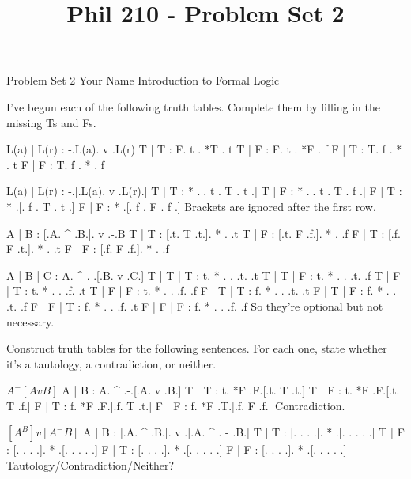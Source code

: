 
\title{Phil 210 - Problem Set 2}

\heading
Problem Set 2
Your Name
Introduction to Formal Logic
\endheading

I've begun each of the following truth tables. Complete them by filling in the missing Ts and Fs.

\problems
{}
\truthtable
 L(a) | L(r) : -.L(a).  v  .L(r)
\truthtableline
  T   |  T   : F. t  . *T  . t
  T   |  F   : F. t  . *F  . f
  F   |  T   : T. f  . *   . t
  F   |  F   : T. f  . *   . f
\endtruthtable

\truthtable
 L(a) | L(r) :  -.[.L(a). v .L(r).]
\truthtableline
  T   |  T   : * .[. t  . T . t  .]
  T   |  F   : * .[. t  . T . f  .]
  F   |  T   : * .[. f  . T . t  .]
  F   |  F   : * .[. f  . F . f  .]
\endtruthtable
\Hint Brackets are ignored after the first row.

\truthtable
 A | B : [.A. ^ .B.].  v  .-.B
\truthtableline
 T | T : [.t. T .t.]. *   . .t
 T | F : [.t. F .f.]. *   . .f
 F | T : [.f. F .t.]. *   . .t
 F | F : [.f. F .f.]. *   . .f
\endtruthtable

\truthtable
 A | B | C : A.  ^  .-.[.B. v .C.]
\truthtableline
 T | T | T : t. *   . . .t.   .t
 T | T | F : t. *   . . .t.   .f
 T | F | T : t. *   . . .f.   .t
 T | F | F : t. *   . . .f.   .f
 F | T | T : f. *   . . .t.   .t
 F | T | F : f. *   . . .t.   .f
 F | F | T : f. *   . . .f.   .t
 F | F | F : f. *   . . .f.   .f
\endtruthtable
\Hint So they're optional but not necessary.

\endproblems
\pagebreak

Construct truth tables for the following sentences. For each one, state whether it's a tautology, a contradiction, or neither.

\problems
{}
$ A ^ -[A v B] $
        \answer
        \truthtable
         A | B : A.  ^  .-.[.A. v .B.]
        \truthtableline
         T | T : t. *F  .F.[.t. T .t.]
         T | F : t. *F  .F.[.t. T .f.]
         F | T : f. *F  .F.[.f. T .t.]
         F | F : f. *F  .T.[.f. F .f.]
        \endtruthtable
        Contradiction.
        \endanswer

$ [A ^ B] v [A ^ -B] $
        \answer
        \truthtable
         A | B : [.A. ^ .B.].  v  .[.A. ^ . - .B.]
        \truthtableline
         T | T : [. .   . .]. *   .[. .   .   . .]
         T | F : [. .   . .]. *   .[. .   .   . .]
         F | T : [. .   . .]. *   .[. .   .   . .]
         F | F : [. .   . .]. *   .[. .   .   . .]
        \endtruthtable
        Tautology/Contradiction/Neither?
        \endanswer

